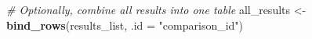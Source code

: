 \documentclass[
]{book}
\newenvironment{Shaded}{\begin{snugshade}}{\end{snugshade}}
\newcommand{\AttributeTok}[1]{\textcolor[rgb]{0.13,0.29,0.53}{#1}}
\newcommand{\CommentTok}[1]{\textcolor[rgb]{0.56,0.35,0.01}{\textit{#1}}}
\newcommand{\FunctionTok}[1]{\textcolor[rgb]{0.13,0.29,0.53}{\textbf{#1}}}
\newcommand{\NormalTok}[1]{#1}
\newcommand{\OtherTok}[1]{\textcolor[rgb]{0.56,0.35,0.01}{#1}}
\newcommand{\StringTok}[1]{\textcolor[rgb]{0.31,0.60,0.02}{#1}}
\begin{document}
\begin{Shaded}
\begin{Highlighting}[]
\CommentTok{\# Optionally, combine all results into one table}
\NormalTok{all\_results }\OtherTok{\textless{}{-}} \FunctionTok{bind\_rows}\NormalTok{(results\_list, }\AttributeTok{.id =} \StringTok{"comparison\_id"}\NormalTok{)}
\end{Highlighting}
\end{Shaded}


\backmatter
\end{document}
